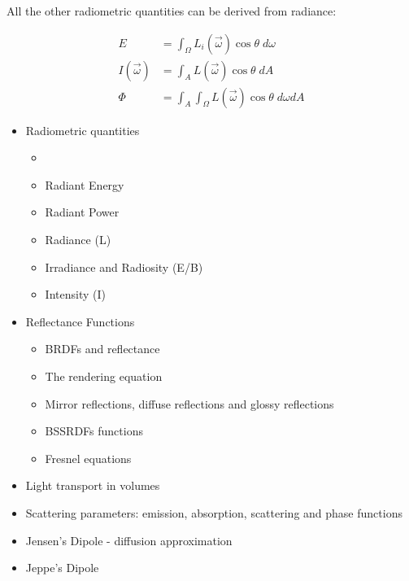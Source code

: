 All the other radiometric quantities can be derived from radiance:

\begin{equation*}
\begin{split}
E &= \int_{\Omega} L_i(\vec{\omega}) \cos\theta \; d\omega \\
I(\vec{\omega}) &= \int_A L(\vec{\omega}) \cos\theta \; dA \\
\Phi &= \int_A \int_{\Omega} L(\vec{\omega}) \cos\theta \; d\omega dA
\end{split}
\end{equation*}

\begin{itemize}
	\item Radiometric quantities

		\begin{itemize}
			\item 	\item Radiant Energy
			\item Radiant Power
			\item Radiance (L)
			\item Irradiance and Radiosity (E/B)
			\item Intensity (I)

\end{itemize}
	\item Reflectance Functions
	
	\begin{itemize}
		\item BRDFs and reflectance
		\item The rendering equation
		\item Mirror reflections, diffuse reflections and glossy reflections
		\item BSSRDFs functions
   	\item Fresnel equations

	\end{itemize}
	
	\item Light transport in volumes
	\item Scattering parameters: emission, absorption, scattering and phase functions
	
	\item Jensen's Dipole - diffusion approximation 
	\item Jeppe's Dipole
	
\end{itemize}
